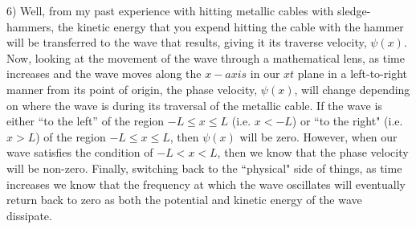 \documentclass[executivepaper]{article}
\begin{document}
\begin{flushleft}

6) Well, from my past experience with hitting metallic cables with sledge-hammers, the kinetic energy that you expend hitting the cable with the hammer will be transferred to the wave that results, giving it its traverse velocity, $\psi(x)$. Now, looking at the movement of the wave through a mathematical lens, as time increases and the wave moves along the $x-axis$ in our $xt$ plane in a left-to-right manner from its point of origin, the phase velocity, $\psi(x)$, will change depending on where the wave is during its traversal of the metallic cable. If the wave is either ``to the left'' of the region $-L \leq x \leq L$ (i.e. $x < -L$) or ``to the right" (i.e. $x > L$) of the region $-L \leq x \leq L$, then $\psi(x)$ will be zero. However, when our wave satisfies the condition of $-L < x < L$, then we know that the phase velocity will be non-zero. Finally, switching back to the ``physical" side of things, as time increases we know that the frequency at which the wave oscillates will eventually return back to zero as both the potential and kinetic energy of the wave dissipate. 

\end{flushleft}
\end{document}
